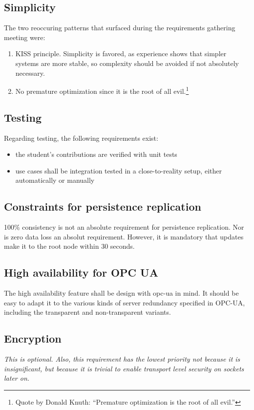 \subsection{Simplicity}
The two reoccuring patterns that surfaced during the requirements gathering
meeting were:

\begin{enumerate}
\item \gls{KISS} principle. Simplicity is favored, as experience shows that
	simpler systems are more stable, so complexity should be avoided if not
	absolutely necessary.

\item No premature optimization since it is the root of all evil.\footnote{Quote
	by Donald Knuth: ``Premature optimization is the root of all evil.''}
\end{enumerate}


\subsection{Testing}
Regarding testing, the following requirements exist:
\begin{itemize}
	\item the student's contributions are verified with unit tests
	\item use cases shall be integration tested in a close-to-reality setup, either automatically or manually
\end{itemize}

\subsection{Constraints for persistence replication}
100\% consistency is not an absolute requirement for persistence replication.
Nor is zero data loss an absolut requirement. However, it is mandatory that
updates make it to the root node within 30 seconds.

\subsection{High availability for OPC UA}
The high availability feature shall be design with \gls{opc-ua} in mind. It
should be easy to adapt it to the various kinds of server redundancy specified
in OPC-UA, including the transparent and non-transparent variants.

\subsection{Encryption}
\emph{This is optional. Also, this requirement has the lowest priority not
because it is insignificant, but because it is trivial to enable transport level
security on \zmq sockets later on.}

